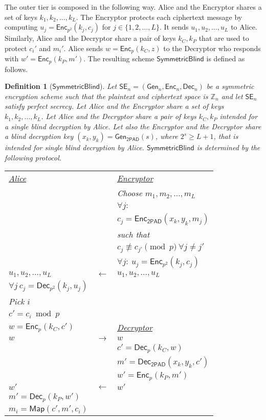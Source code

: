\documentclass[10pt,journal]{IEEEtran}
\newcommand{\Z}{\mathbb{Z}}
\newcommand{\alg}[1]{\mathsf{#1}}
\newcommand{\sch}[1]{\mathsf{#1}}
\newtheorem{definition}{Definition}[section]
\begin{document}
The outer tier is composed in the following way. Alice and the Encryptor shares
a set of keys $k_1,k_2,\ldots,k_L$. The Encryptor protects each ciphertext message
by computing $u_j = \alg{Enc}_{p^2}(k_j,c_j)$ for $j \in \{1,2,\ldots,L\}$. It sends
$u_1,u_2,\ldots,u_L$ to Alice. Similarly, Alice and the Decryptor
share a pair of keys $k_C,k_P$ that are used to protect
$c_i'$ and $m_i'$. Alice sends $w = \alg{Enc}_{p}(k_C,z)$ to the Decryptor
who responds with $w' = \alg{Enc}_p(k_P,m')$.
The resulting scheme $\sch{SymmetricBlind}$ is defined as follows.
\begin{definition}[$\sch{SymmetricBlind}$]
\label{def:the_final_scheme}
Let $\sch{SE}_n = (\alg{Gen}_n,\alg{Enc}_n,\alg{Dec}_n)$ be a symmetric encryption scheme
such that the plaintext and ciphertext space is $\Z_n$ and
let $\sch{SE}_n$ satisfy perfect secrecy.
Let Alice and the Encryptor share a set of keys $k_1,k_2,\ldots,k_L$. Let
Alice and the Decryptor share a pair of keys $k_C,k_P$ intended for
a single blind decryption by Alice. Let also the Encryptor and the Decryptor
share a blind decryption key $(x_k,y_k) = \alg{Gen}_{\sch{2PAD}}(s)$, where $2^s \geq L +1$,
that is intended for single blind decryption
by Alice. $\sch{SymmetricBlind}$ is determined by the following protocol.
\begin{center}
\begin{tabular}{|lll|}
\hline
\underline{Alice} & & \underline{Encryptor} \\
& & Choose $m_1,m_2,\ldots,m_L$ \\
& & $\forall j:$ \\ & & $c_j = \alg{Enc}_{\sch{2PAD}}(x_{k},y_{k},m_j)$ \\
& & such that \\
& & $c_{j} \not \equiv c_{j'}\pmod{p}~\forall j \neq j'$\\
& & $\forall j: ~ u_j = \alg{Enc}_{p^2}(k_j,c_j)$ \\
$u_1,u_2,\ldots,u_L$ & $\longleftarrow$ & $u_1,u_2,\ldots,u_L$ \\
$\forall j ~ c_j = \alg{Dec}_{p^2}(k_j,u_j)$ & & \\
Pick $i$ & & \\
$c' = c_i \bmod{p}$ & & \\
$w = \alg{Enc}_{p}(k_C,c')$ & & \underline{Decryptor}\\
$w$ & $\longrightarrow$ & $w$ \\
& & $c' = \alg{Dec}_p(k_C,w)$ \\
& & $m' = \alg{Dec}_{\sch{2PAD}}(x_{k},y_{k},c')$ \\
& & $w' = \alg{Enc}_p(k_P,m')$ \\
$w'$ & $\longleftarrow$ & $w'$ \\
$m' = \alg{Dec}_p(k_P,w')$ & & \\
$m_i = \alg{Map}(c',m',c_i)$ & & \\
\hline
\end{tabular}
\end{center}
\end{definition}
\end{document}
